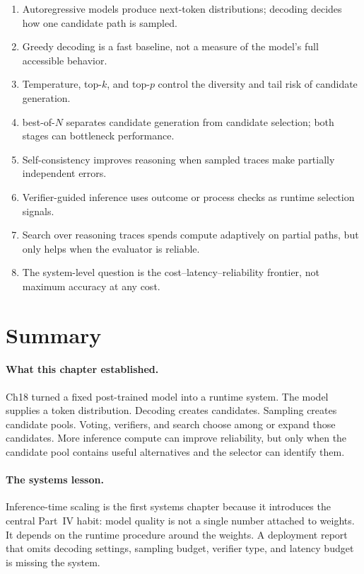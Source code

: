 \begin{takeaways}
\begin{enumerate}
  \item Autoregressive models produce next-token distributions; decoding decides how one candidate path is sampled.
  \item Greedy decoding is a fast baseline, not a measure of the model's full accessible behavior.
  \item Temperature, top-$k$, and top-$p$ control the diversity and tail risk of candidate generation.
  \item best-of-$N$ separates candidate generation from candidate selection; both stages can bottleneck performance.
  \item Self-consistency improves reasoning when sampled traces make partially independent errors.
  \item Verifier-guided inference uses outcome or process checks as runtime selection signals.
  \item Search over reasoning traces spends compute adaptively on partial paths, but only helps when the evaluator is reliable.
  \item The system-level question is the cost--latency--reliability frontier, not maximum accuracy at any cost.
\end{enumerate}
\end{takeaways}


\section*{Summary}

\paragraph{What this chapter established.} Ch18 turned a fixed post-trained model into a runtime system. The model supplies a token distribution. Decoding creates candidates. Sampling creates candidate pools. Voting, verifiers, and search choose among or expand those candidates. More inference compute can improve reliability, but only when the candidate pool contains useful alternatives and the selector can identify them.

\paragraph{The systems lesson.} Inference-time scaling is the first systems chapter because it introduces the central Part~IV habit: model quality is not a single number attached to weights. It depends on the runtime procedure around the weights. A deployment report that omits decoding settings, sampling budget, verifier type, and latency budget is missing the system.

